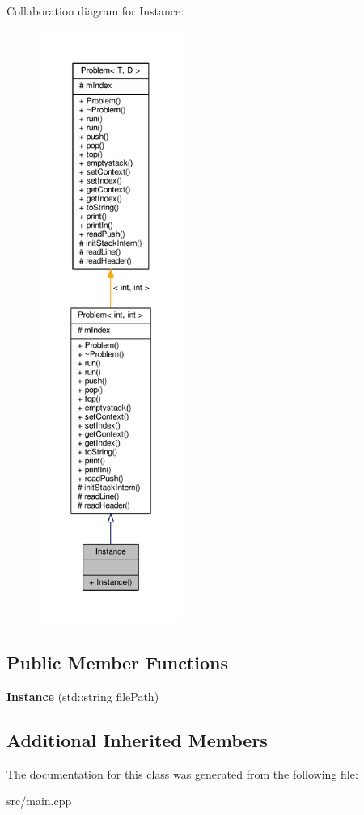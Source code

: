Collaboration diagram for Instance\+:
\nopagebreak
\begin{figure}[H]
\begin{center}
\leavevmode
\includegraphics[height=550pt]{class_instance__coll__graph}
\end{center}
\end{figure}
\subsection*{Public Member Functions}
\begin{DoxyCompactItemize}
\item 
{\bfseries Instance} (std\+::string file\+Path)\hypertarget{class_instance_a4481e14389cf698ecd6f48ca1c86c60a}{}\label{class_instance_a4481e14389cf698ecd6f48ca1c86c60a}

\end{DoxyCompactItemize}
\subsection*{Additional Inherited Members}


The documentation for this class was generated from the following file\+:\begin{DoxyCompactItemize}
\item 
src/main.\+cpp\end{DoxyCompactItemize}

